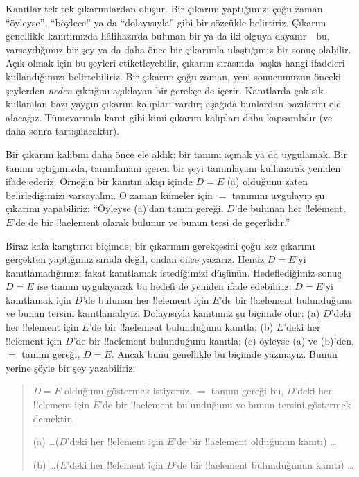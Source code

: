 



Kanıtlar tek tek çıkarımlardan oluşur. Bir çıkarım yaptığımızı çoğu
zaman ``öyleyse'', ``böylece'' ya da ``dolayısıyla'' gibi bir sözcükle
belirtiriz. Çıkarım genellikle kanıtımızda hâlihazırda bulunan bir ya da
iki olguya dayanır---bu, varsaydığımız bir şey ya da daha önce bir
çıkarımla ulaştığımız bir sonuç olabilir. Açık olmak için bu şeyleri
etiketleyebilir, çıkarım sırasında başka hangi ifadeleri kullandığımızı
belirtebiliriz. Bir çıkarım çoğu zaman, yeni sonucumuzun önceki
şeylerden \emph{neden} çıktığını açıklayan bir gerekçe de içerir.
Kanıtlarda çok sık kullanılan bazı yaygın çıkarım kalıpları vardır;
aşağıda bunlardan bazılarını ele alacağız. Tümevarımla kanıt gibi kimi
çıkarım kalıpları daha kapsamlıdır (ve daha sonra tartışılacaktır).

Bir çıkarım kalıbını daha önce ele aldık: bir tanımı açmak ya da
uygulamak. Bir tanımı açtığımızda, tanımlananı içeren bir şeyi
tanımlayanı kullanarak yeniden ifade ederiz. Örneğin bir kanıtın
akışı içinde $D = E$ (a) olduğunu zaten belirlediğimizi varsayalım.
O zaman kümeler için $=$ tanımını uygulayıp şu çıkarımı yapabiliriz:
``Öyleyse (a)'dan tanım gereği, $D$'de bulunan her !!{element}, $E$'de
de bir !!a{element} olarak bulunur ve bunun tersi de geçerlidir.''

Biraz kafa karıştırıcı biçimde, bir çıkarımın gerekçesini çoğu kez
çıkarımı gerçekten yaptığımız sırada değil, ondan önce yazarız. Henüz
$D = E$'yi kanıtlamadığımızı fakat kanıtlamak istediğimizi düşünün.
Hedeflediğimiz sonuç $D = E$ ise tanımı uygulayarak bu hedefi de yeniden
ifade edebiliriz: $D = E$'yi kanıtlamak için $D$'de bulunan her
!!{element} için $E$'de bir !!a{element} bulunduğunu ve bunun tersini
kanıtlamalıyız. Dolayısıyla kanıtımız şu biçimde olur: (a) $D$'deki her
!!{element} için $E$'de bir !!a{element} bulunduğunu kanıtla; (b)
$E$'deki her !!{element} için $D$'de bir !!a{element} bulunduğunu kanıtla; (c)
öyleyse (a) ve (b)'den, $=$ tanımı gereği, $D = E$. Ancak bunu genellikle
bu biçimde yazmayız. Bunun yerine şöyle bir şey yazabiliriz:
\begin{quote}
$D = E$ olduğunu göstermek istiyoruz. $=$ tanımı gereği bu, $D$'deki
her !!{element} için $E$'de bir !!a{element} bulunduğunu ve bunun tersini
göstermek demektir.

(a) \dots ($D$'deki her !!{element} için $E$'de bir !!a{element}
olduğunun kanıtı) \dots

(b) \dots ($E$'deki her !!{element} için
$D$'de bir !!a{element} bulunduğunun kanıtı) \dots
\end{quote}

